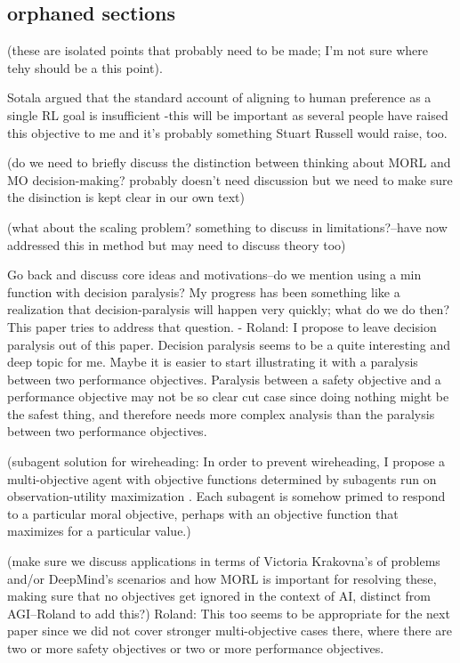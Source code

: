 \subsection{orphaned sections}

(these are isolated points that probably need to be made; I'm not sure where tehy should be a this point).

Sotala argued that the standard account of aligning to human preference as a single RL goal is insufficient \cite{sotala2016defining} -this will be important as several people have raised this objective to me and it's probably something Stuart Russell would raise, too.

(do we need to briefly discuss the distinction between thinking about MORL and MO decision-making? probably doesn't need discussion but we need to make sure the disinction is kept clear in our own text)

(what about the scaling problem? something to discuss in limitations?--have now addressed this in method but may need to discuss theory too)

Go back and discuss core ideas and motivations--do we mention using a min function with decision paralysis? My progress has been something like a realization that decision-paralysis will happen very quickly; what do we do then? This paper tries to address that question.
- Roland: I propose to leave decision paralysis out of this paper. Decision paralysis seems to be a quite interesting and deep topic for me. Maybe it is easier to start illustrating it with a paralysis between two performance objectives. Paralysis between a safety objective and a performance objective may not be so clear cut case since doing nothing might be the safest thing, and therefore needs more complex analysis than the paralysis between two performance objectives. 

(subagent solution for wireheading: In order to prevent wireheading, I propose a multi-objective agent with objective functions determined by subagents run on observation-utility maximization \cite{dewey_learning_2011}. Each subagent is somehow primed to respond to a particular moral objective, perhaps with an objective function that maximizes for a particular value.)


(make sure we discuss applications in terms of Victoria Krakovna's of problems and/or DeepMind's scenarios and how MORL is important for resolving these, making sure that no objectives get ignored in the context of AI, distinct from AGI--Roland to add this?)
Roland: This too seems to be appropriate for the next paper since we did not cover stronger multi-objective cases there, where there are two or more safety objectives or two or more performance objectives.

